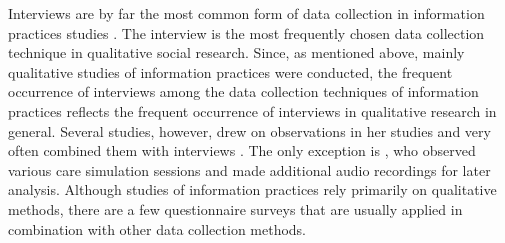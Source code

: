 \documentclass[12pt, a4paper, titlepage, oneside, abstract=true, toc=listof, toc=bibliography, BCOR=1cm]{scrreprt}
\begin{document}
Interviews are by far the most common form of data collection in information practices studies \citep{Bonner2011, Boyum2015, Caidi2008a, Floegel2019, Fry2006, Greyson2017, Greyson2018, Johannisson2007, Harlan2012, Harlan2012a, Harlan2014, Kitzie2020, Lloyd2007, Lloyd2013, McKenzie2002, McKenzie2003, McKenzie2003a, Olsson2007, Olsson2010, Olsson2016, Roos2015, Talja2003, Veinot2007}. The interview is the most frequently chosen data collection technique in qualitative social research. Since, as mentioned above, mainly qualitative studies of information practices were conducted, the frequent occurrence of interviews among the data collection techniques of information practices reflects the frequent occurrence of interviews in qualitative research in general. 
Several studies, however, drew on observations in her studies and very often combined them with interviews \citep{Greyson2017, Greyson2018, Harlan2012, Harlan2014, Mohammad2020, Olsson2016}. The only exception is \citet{Mohammad2020}, who observed various care simulation sessions and made additional audio recordings for later analysis. 
Although studies of information practices rely primarily on qualitative methods, there are a few questionnaire surveys \citep[e.g.][]{AhenkorahMarfo2016, Caidi2008a} that are usually applied in combination with other data collection methods.  
\end{document}
